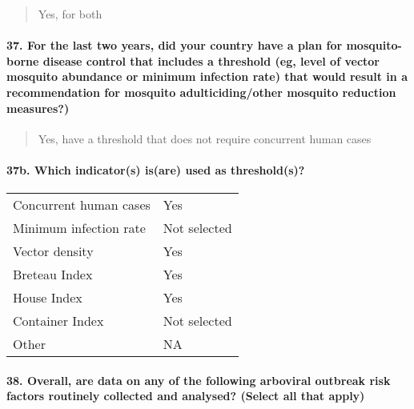 \documentclass[
]{article}
\begin{document}
\begin{quote}
Yes, for both
\end{quote}

\hypertarget{for-the-last-two-years-did-your-country-have-a-plan-for-mosquito-borne-disease-control-that-includes-a-threshold-eg-level-of-vector-mosquito-abundance-or-minimum-infection-rate-that-would-result-in-a-recommendation-for-mosquito-adulticidingother-mosquito-reduction-measures}{%
\paragraph{37. For the last two years, did your country have a plan for
mosquito-borne disease control that includes a threshold (eg, level of
vector mosquito abundance or minimum infection rate) that would result
in a recommendation for mosquito adulticiding/other mosquito reduction
measures?)}\label{for-the-last-two-years-did-your-country-have-a-plan-for-mosquito-borne-disease-control-that-includes-a-threshold-eg-level-of-vector-mosquito-abundance-or-minimum-infection-rate-that-would-result-in-a-recommendation-for-mosquito-adulticidingother-mosquito-reduction-measures}}

\begin{quote}
Yes, have a threshold that does not require concurrent human cases
\end{quote}

\hypertarget{b.-which-indicators-isare-used-as-thresholds}{%
\paragraph{37b. Which indicator(s) is(are) used as
threshold(s)?}\label{b.-which-indicators-isare-used-as-thresholds}}

\begin{longtable}[]{@{}ll@{}}
\toprule
\endhead
Concurrent human cases & Yes \\
Minimum infection rate & Not selected \\
Vector density & Yes \\
Breteau Index & Yes \\
House Index & Yes \\
Container Index & Not selected \\
Other & NA \\
\bottomrule
\end{longtable}

\hypertarget{overall-are-data-on-any-of-the-following-arboviral-outbreak-risk-factors-routinely-collected-and-analysed-select-all-that-apply}{%
\paragraph{38. Overall, are data on any of the following arboviral
outbreak risk factors routinely collected and analysed? (Select all that
apply)}\label{overall-are-data-on-any-of-the-following-arboviral-outbreak-risk-factors-routinely-collected-and-analysed-select-all-that-apply}}
\end{document}

